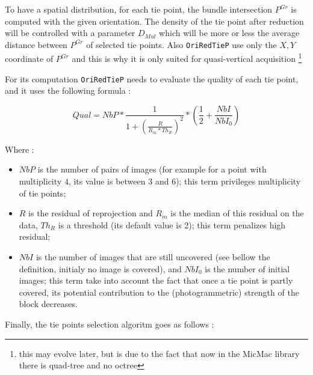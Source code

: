 To have a spatial distribution, for each tie point, the bundle intersection $P^{Gr}$ is computed
with the given orientation. The density of the tie point after reduction will be
controlled with a parameter $D_{Mul}$ which will be more or less the average
distance between $P^{Gr}$ of selected tie points. Also {\tt OriRedTieP} use only the $X,Y$
coordinate of $P^{Gr}$  and this is why it is only suited for quasi-vertical acquisition
\footnote{this may evolve later, but is due to the fact that now in the MicMac library there is quad-tree and no octree}


For its computation {\tt OriRedTieP} needs to evaluate the quality of each tie point, and it uses the
following formula :

\begin{equation}
   Qual= NbP * \frac{1}{1+(\frac{R}{R_m * Th_R})^2 } * (\frac{1}{2}+\frac{NbI}{NbI_0}) \label{QualTieP}
\end{equation}

Where :

\begin{itemize}
   \item $NbP$ is the number of pairs of images (for example for a point with multiplicity $4$,
         its value is between $3$ and $6$); this term privileges multiplicity of tie points;

   \item $R$ is the residual of reprojection and $R_m$ is the median of this residual on the data,
         $Th_R$ is a threshold (its default value is $2$); this term penalizes  high residual;

   \item $NbI$ is the number of images that are still uncovered (see bellow the definition, initialy no image is covered),
        and $NbI_0$ is the number of initial images; this term take into account the fact that once
        a tie point is partly covered, its potential contribution to the (photogrammetric) strength of the block decreases.

\end{itemize}

Finally, the tie points selection algoritm goes as follows :

